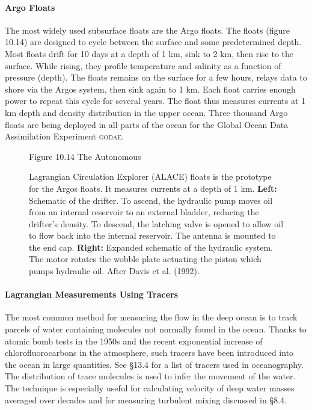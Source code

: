 \paragraph{Argo Floats}
The most widely used subsurface floats are the Argo floats. The floats (figure 10.14) are designed to cycle between the surface and some
predetermined depth. Most floats drift for 10 days at a depth of 1 km, sink to 2 km, then rise to the surface. While rising, they profile temperature and salinity as a function of pressure (depth). The floats remains on the surface for a few hours, relays data to shore via the Argos system, then sink again to 1 km. Each float carries enough power to repeat this cycle for several years. The float thus measures currents at 1 km depth and density distribution in the upper ocean. Three thousand Argo floats are being deployed in all parts of the ocean for the Global Ocean Data Assimilation Experiment \textsc{godae}.

\begin{figure}[h!]
\vspace{-2ex}
\footnotesize
Figure 10.14 The Autonomous \rule{0mm}{4ex}Lagrangian Circulation Explorer (ALACE) floats is the prototype for the Argos floats. It measures currents at a depth of 1 km. \textbf{Left:} Schematic of the drifter. To ascend, the hydraulic pump moves oil from an
internal reservoir to an external bladder, reducing the drifter's density. To descend, the
latching valve is opened to allow oil to flow back into the internal reservoir.
The antenna is mounted to the end cap. \textbf{Right:} Expanded schematic of the
hydraulic system. The motor rotates the wobble plate actuating the piston which
pumps hydraulic oil. After Davis et al. (1992).
\label{fig:alace}
\vspace{-2ex}
\end{figure}

\paragraph{Lagrangian Measurements Using Tracers}
The most common method for measuring the flow in the deep ocean is to track parcels of water containing molecules not normally found in the ocean.
Thanks to atomic bomb tests in the 1950s and the recent exponential increase 
of chlorofluorocarbons in the atmosphere, such tracers have been introduced into the
ocean in large quantities. See \S 13.4 for a list of tracers used in oceanography. The
distribution of trace molecules is used to infer the movement of the water. The
technique is especially useful for calculating velocity of deep water masses averaged
over decades and for measuring turbulent mixing discussed in \S 8.4.

